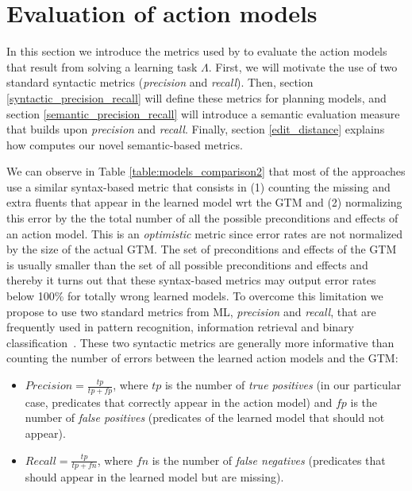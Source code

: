 
\section{Evaluation of action models}
\label{sec:evaluation}

In this section we introduce the metrics used by \FAMA to evaluate the action models that result from solving a learning task $\Lambda$. First, we will motivate the use of two standard syntactic metrics ({\em precision} and {\em recall}). Then, section \ref{syntactic_precision_recall} will define these metrics for planning models, and section \ref{semantic_precision_recall} will introduce a semantic evaluation measure that builds upon {\em precision} and {\em recall}. Finally, section \ref{edit_distance} explains how \FAMA computes our novel semantic-based metrics.


We can observe in Table \ref{table:models_comparison2} that most of the approaches use a similar syntax-based metric that consists in (1) counting the missing and extra fluents that appear in the learned model wrt the GTM and (2) normalizing this error by the the total number of all the possible preconditions and effects of an action model. This is an \emph{optimistic} metric since error rates are not normalized by the size of the actual GTM. The set of preconditions and effects of the GTM is usually smaller than the set of all possible preconditions and effects and thereby it turns out that these syntax-based metrics may output error rates below 100\% for totally wrong learned models. To overcome this limitation we propose to use two standard metrics from ML, {\em precision} and {\em recall}, that are frequently used in pattern recognition, information retrieval and binary classification~\cite{davis2006relationship}. These two syntactic metrics are generally more informative than counting the number of errors between the learned action models and the GTM:


\begin{itemize}
\item $Precision=\frac{tp}{tp+fp}$, where $tp$ is the number of {\em true positives} (in our particular case, predicates that correctly appear in the action model) and $fp$ is the number of {\em false positives} (predicates of the learned model that should not appear).
\item $Recall=\frac{tp}{tp+fn}$, where $fn$ is the number of {\em false negatives} (predicates that should appear in the learned model but are missing).
\end{itemize}

